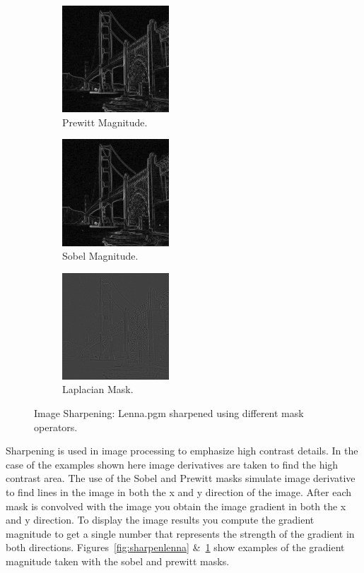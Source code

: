 \documentclass[letterpaper,10pt]{article}
\begin{document}
  \begin{figure}[hbtp]
    \centering
    \begin{subfigure}{4cm}
      \includegraphics[width=4cm]{images/prewitt_sf.png}
      \caption{Prewitt Magnitude.}
    \end{subfigure}
    \begin{subfigure}{4cm}
      \includegraphics[width=4cm]{images/sobel_sf.png}
      \caption{Sobel Magnitude.}
    \end{subfigure}
    \begin{subfigure}{4cm}
      \includegraphics[width=4cm]{images/laplacian_sf.png}
      \caption{Laplacian Mask.}
    \end{subfigure}
    \caption{Image Sharpening: Lenna.pgm sharpened using different mask operators.}
    \label{fig:sharpensf}
  \end{figure}
Sharpening is used in image processing to emphasize high contrast details. In the case of the examples shown here image derivatives are taken to find the high contrast area. The use of the Sobel and Prewitt masks simulate image derivative to find lines in the image in both the x and y direction of the image. After each mask is convolved with the image you obtain the image gradient in both the x and y direction. To display the image results you compute the gradient magnitude to get a single number that represents the strength of the gradient in both directions. Figures~\ref{fig:sharpenlenna} \&~\ref{fig:sharpensf} show examples of the gradient magnitude taken with the sobel and prewitt masks.
\end{document}
